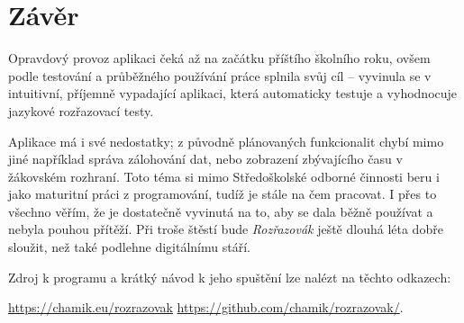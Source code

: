 \chapter*{Závěr}

Opravdový provoz aplikaci čeká až na začátku příštího školního roku, ovšem podle testování a průběžného používání práce splnila svůj cíl -- vyvinula se v intuitivní, příjemně vypadající aplikaci, která automaticky testuje a vyhodnocuje jazykové rozřazovací testy. 

Aplikace má i své nedostatky; z původně plánovaných funkcionalit chybí mimo jiné například správa zálohování dat, nebo zobrazení zbývajícího času v žákovském rozhraní. Toto téma si mimo Středoškolské odborné činnosti beru i jako maturitní práci z programování, tudíž je stále na čem pracovat. I přes to všechno věřím, že je dostatečně vyvinutá na to, aby se dala běžně používat a nebyla pouhou přítěží. Při troše štěstí bude \textit{Rozřazovák} ještě dlouhá léta dobře sloužit, než také podlehne digitálnímu stáří.

Zdroj k programu a krátký návod k jeho spuštění lze nalézt na těchto odkazech:

\href{https://chamik.eu/rozrazovak}{https://chamik.eu/rozrazovak} \newline
\href{https://github.com/chamik/rozrazovak/}{https://github.com/chamik/rozrazovak/}.